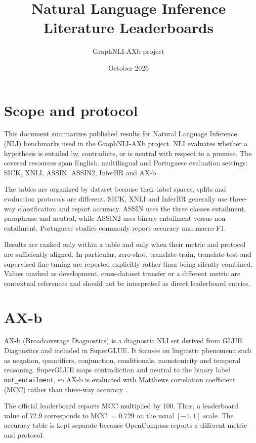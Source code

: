\documentclass[10pt]{article}
\title{Natural Language Inference Literature Leaderboards}
\author{GraphNLI-AXb project}
\date{October 2026}
\begin{document}
\maketitle

\section*{Scope and protocol}

This document summarizes published results for Natural Language Inference
(NLI) benchmarks used in the GraphNLI-AXb project. NLI evaluates whether a
hypothesis is entailed by, contradicts, or is neutral with respect to a
premise. The covered resources span English, multilingual and Portuguese
evaluation settings: SICK, XNLI, ASSIN, ASSIN2, InferBR and AX-b.

The tables are organized by dataset because their label spaces, splits and
evaluation protocols are different. SICK, XNLI and InferBR generally use
three-way classification and report accuracy. ASSIN uses the three classes
entailment, paraphrase and neutral, while ASSIN2 uses binary entailment versus
non-entailment. Portuguese studies commonly report accuracy and macro-F1.

Results are ranked only within a table and only when their metric and protocol
are sufficiently aligned. In particular, zero-shot, translate-train,
translate-test and supervised fine-tuning are reported explicitly rather than
being silently combined. Values marked as development, cross-dataset transfer
or a different metric are contextual references and should not be interpreted
as direct leaderboard entries.

\section*{AX-b}

AX-b (Broadcoverage Diagnostics) is a diagnostic NLI set derived from GLUE
Diagnostics and included in SuperGLUE. It focuses on linguistic phenomena
such as negation, quantifiers, conjunction, conditionals, monotonicity and
temporal reasoning. SuperGLUE maps contradiction and neutral to the binary
label \texttt{not\_entailment}, so AX-b is evaluated with Matthews
correlation coefficient (MCC) rather than three-way accuracy
\cite{wang2019superglue}.

The official leaderboard reports MCC multiplied by 100. Thus, a leaderboard
value of 72.9 corresponds to MCC $=0.729$ on the usual $[-1,1]$ scale. The
accuracy table is kept separate because OpenCompass reports a different metric
and protocol.
\end{document}
